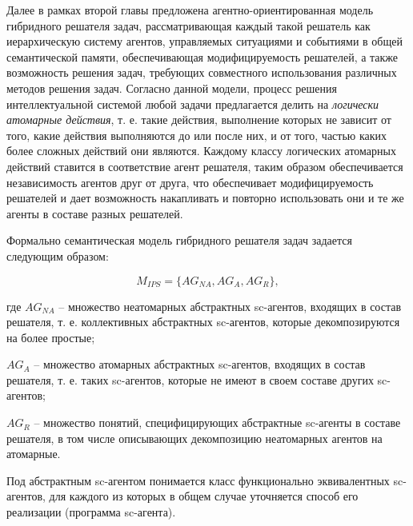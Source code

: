 \documentclass{thesisby}
\begin{document}
Далее в рамках второй главы предложена агентно-ориентированная модель гибридного решателя задач, рассматривающая каждый такой решатель как иерархическую систему агентов, управляемых ситуациями и событиями в общей семантической памяти, обеспечивающая модифицируемость решателей, а также возможность решения задач, требующих совместного использования различных методов решения задач. Согласно данной модели, процесс решения интеллектуальной системой любой задачи предлагается делить на \textit{логически атомарные действия}, т. е. такие действия, выполнение которых не зависит от того, какие действия выполняются до или после них, и от того, частью каких более сложных действий они являются. Каждому классу логических атомарных действий ставится в соответствие агент решателя, таким образом обеспечивается независимость агентов друг от друга, что обеспечивает модифицируемость решателей и дает возможность накапливать и повторно использовать они и те же агенты в составе разных решателей.

Формально семантическая модель гибридного решателя задач задается следующим образом:

\vspace{-4mm}

\begin{equation}
    \label{<eq2_6>} 
    M_{IPS} = \{AG_{NA}, AG_A, AG_R\},	
\end{equation}

\noindent \hangindent=29mm 
где $AG_{NA}$ – множество неатомарных абстрактных sc-агентов, входящих в состав решателя, т. е. коллективных абстрактных sc-агентов, которые декомпозируются на более простые;

\parindent=9mm \hangindent=25mm 
$AG_A$ – множество атомарных абстрактных sc-агентов, входящих в состав решателя, т. е. таких sc-агентов, которые не имеют в своем составе других sc-агентов;


\parindent=9mm \hangindent=25mm 
$AG_R$ – множество понятий, специфицирующих абстрактные sc-агенты в составе решателя, в том числе описывающих декомпозицию неатомарных агентов на атомарные.

\medskip
\parindent=1cm

Под абстрактным sc-агентом понимается класс функционально эквивалентных sc-агентов, для каждого из которых в общем случае уточняется способ его реализации (программа sc-агента).
\end{document}
